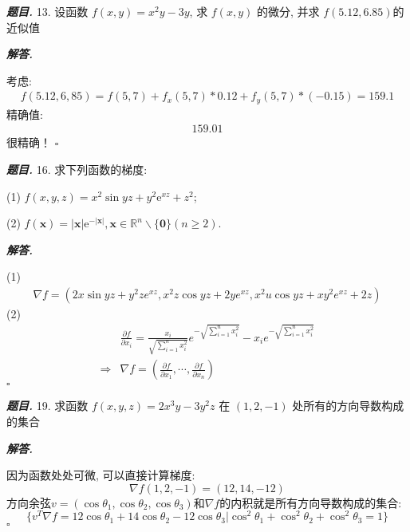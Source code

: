\documentclass[10pt, a4paper, oneside]{ctexart}
\newenvironment{problem}{\begin{framed}\par\noindent\textbf{\textit{题目. }}}{\end{framed}\par}
\newenvironment{solution}{%
  \par\noindent\textbf{\textit{解答. }}\ignorespaces
}{%
  \hfill\ensuremath{\square}\par %
}
\begin{document}
\begin{problem}
13. 设函数 $f(x, y)=x^2 y-3 y$, 求 $f(x, y)$ 的微分, 并求 $f(5.12,6.85)$的近似值
\end{problem}
\begin{solution}
考虑:
\begin{align*}
    f(5.12,6,85)=f(5,7)+f_x(5,7)*0.12+f_y(5,7)*(-0.15)=159.1
\end{align*}
精确值:
\begin{align*}
    159.01
\end{align*}
很精确！
\end{solution}

\begin{problem}
16. 求下列函数的梯度:

(1) $f(x, y, z)=x^2 \sin y z+y^2 \mathrm{e}^{x z}+z^2$;

(2) $f(\boldsymbol{x})=|\boldsymbol{x}| \mathrm{e}^{-|\boldsymbol{x}|}, \boldsymbol{x} \in \mathbb{R}^n \backslash\{\boldsymbol{0}\}(n \geqslant 2)$.
\end{problem}
\begin{solution}
(1) 
\begin{align*}
    \nabla f = (2x\sin yz+y^2ze^{xz},x^2z\cos yz+2ye^{xz},x^2u\cos yz+xy^2e^{xz}+2z)
\end{align*}
(2)
\begin{align*}
    &\frac{\partial f}{\partial x_i}=\frac{x_i}{\sqrt{\sum_{i=1}^n x_i^2}}e^{-\sqrt{\sum_{i=1}^n x_i^2}}-x_ie^{-\sqrt{\sum_{i=1}^n x_i^2}}\\
    \Rightarrow&\nabla f=(\frac{\partial f}{\partial x_1},\cdots,\frac{\partial f}{\partial x_n})
\end{align*}
\end{solution}

\begin{problem}
19. 求函数 $f(x, y, z)=2 x^3 y-3 y^2 z$ 在 $(1,2,-1)$ 处所有的方向导数构成的集合
\end{problem}

\begin{solution}
因为函数处处可微, 可以直接计算梯度:
$$\nabla f(1,2,-1)=(12,14,-12)$$
方向余弦$v=(\cos \theta_1,\cos \theta_2,\cos \theta_3)$和$\nabla f$的内积就是所有方向导数构成的集合:
$$\{v^T\nabla f=12\cos \theta_1+14\cos \theta_2-12\cos \theta_3|\cos^2 \theta_1+\cos^2\theta_2+\cos^2 \theta_3=1\}$$
\end{solution}
\end{document}
